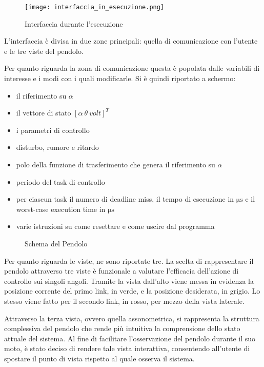 \label{sez:interfaccia}



\begin{figure}[]
	\centering
	\texttt{[image: interfaccia\_in\_esecuzione.png]}
	\caption{Interfaccia durante l'esecuzione}
	\label{fig:interfaccia_in_esecuzione}
\end{figure}

L'interfaccia \`e divisa in due zone principali: quella di comunicazione con l'utente e le tre viste del pendolo.

Per quanto riguarda la zona di comunicazione questa \`e popolata dalle variabili di interesse e i modi con i quali modificarle. Si \`e quindi riportato a schermo:
\begin{itemize}
	\item il riferimento su $\alpha$
	\item  il vettore di stato $\left[ \alpha \ \theta \ volt\right]^T$
	\item i parametri di controllo	
	\item disturbo, rumore e ritardo	
	\item polo della funzione di trasferimento che genera il riferimento su $\alpha$
	\item periodo del task di controllo
	\item per ciascun task il numero di deadline miss, il tempo di esecuzione in $\si{\micro \second}$ e il worst-case execution time in $\si{\micro \second}$
	\item varie istruzioni su come resettare e come uscire dal programma
\end{itemize}

\begin{figure}[]
	\centering
	\def\svgwidth{0.7\linewidth}
	
	\caption{Schema del Pendolo}
	\label{fig:pendolo_schema}
\end{figure}

Per quanto riguarda le viste, ne sono riportate tre. La scelta di rappresentare il pendolo attraverso tre viste \`e funzionale a valutare l'efficacia dell'azione di controllo sui singoli angoli.
Tramite la vista dall'alto viene messa in evidenza la posizione corrente del primo link, in verde, e la posizione desiderata, in grigio. Lo stesso viene fatto per il secondo link, in rosso, per mezzo della vista laterale.

Attraverso la terza vista, ovvero quella assonometrica, si rappresenta la struttura complessiva del pendolo che rende pi\`u intuitiva la comprensione dello stato attuale del sistema. Al fine di facilitare l'osservazione del pendolo durante il suo moto, \`e stato deciso di rendere tale vista interattiva, consentendo all'utente di spostare il punto di vista rispetto al quale osserva il sistema.

